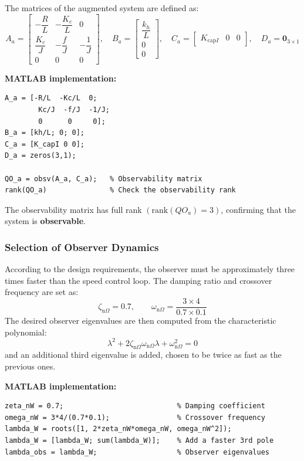 \documentclass{rapportCS}
\begin{document}
The matrices of the augmented system are defined as:
\begin{equation*}
A_a = 
\begin{bmatrix}
-\dfrac{R}{L} & -\dfrac{K_c}{L} & 0 \\[6pt]
\dfrac{K_c}{J} & -\dfrac{f}{J} & -\dfrac{1}{J} \\[6pt]
0 & 0 & 0
\end{bmatrix},
\quad
B_a =
\begin{bmatrix}
\dfrac{k_h}{L} \\[4pt] 0 \\[4pt] 0
\end{bmatrix},
\quad
C_a = 
\begin{bmatrix}
K_{\mathrm{cap}I} & 0 & 0
\end{bmatrix},
\quad
D_a = \mathbf{0}_{3\times1}
\end{equation*}

\noindent\textbf{MATLAB implementation:}
\begin{verbatim}
A_a = [-R/L  -Kc/L  0;
        Kc/J  -f/J  -1/J;
        0      0     0];
B_a = [kh/L; 0; 0];
C_a = [K_capI 0 0];
D_a = zeros(3,1);

QO_a = obsv(A_a, C_a);   % Observability matrix
rank(QO_a)               % Check the observability rank
\end{verbatim}

\noindent The observability matrix has full rank $(\mathrm{rank}(QO_a)=3)$, confirming that the system is \textbf{observable}.

\subsubsection{Selection of Observer Dynamics}

According to the design requirements, the observer must be approximately three times faster than the speed control loop.  
The damping ratio and crossover frequency are set as:
\[
\zeta_{\mathrm{n}\Omega} = 0.7, \qquad \omega_{\mathrm{n}\Omega} = \frac{3\times4}{0.7\times0.1}
\]
The desired observer eigenvalues are then computed from the characteristic polynomial:
\[
\lambda^2 + 2\zeta_{\mathrm{n}\Omega}\omega_{\mathrm{n}\Omega}\lambda + \omega_{\mathrm{n}\Omega}^2 = 0
\]
and an additional third eigenvalue is added, chosen to be twice as fast as the previous ones.

\noindent\textbf{MATLAB implementation:}
\begin{verbatim}
zeta_nW = 0.7;                           % Damping coefficient
omega_nW = 3*4/(0.7*0.1);                % Crossover frequency
lambda_W = roots([1, 2*zeta_nW*omega_nW, omega_nW^2]);
lambda_W = [lambda_W; sum(lambda_W)];    % Add a faster 3rd pole
lambda_obs = lambda_W;                   % Observer eigenvalues
\end{verbatim}
\end{document}
